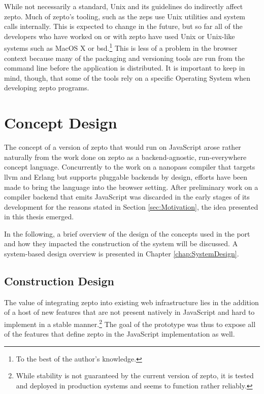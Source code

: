 \documentclass[oneside,11pt,xetex]{scrbook}
\begin{document}
While not necessarily a standard, Unix and its guidelines do indirectly affect zepto. Much of zepto's
tooling, such as the \gls{zeps} use Unix utilities and system calls internally. This is expected to change
in the future, but so far all of the developers who have worked on or with zepto have used Unix
or Unix-like systems such as MacOS X or \gls{bsd}.\footnote{To the best of the author's knowledge.}
This is less of a problem in the browser context because many of the packaging and versioning
tools are run from the command line before the application is distributed. It is important to
keep in mind, though, that some of the tools rely on a specific Operating System when
developing zepto programs.

\chapter{Concept Design}
\label{chap:ConceptDesign}

The concept of a version of zepto that would run on JavaScript arose rather
naturally from the work done on zepto as a backend-agnostic, run-everywhere
concept language. Concurrently to the work on a nanopass compiler that
targets \gls{llvm} and Erlang but supports pluggable backends by design, efforts
have been made to bring the language into the browser setting. After preliminary
work on a compiler backend that emits JavaScript was discarded in the
early stages of its development for the reasons stated in Section \ref{sec:Motivation},
the idea presented in this thesis emerged.

In the following, a brief overview of the design of the concepts used
in the port and how they impacted the construction of the system will be
discussed. A system-based design overview is presented in Chapter \ref{chap:SystemDesign}.

\section{Construction Design}
\label{sec:ConstructionDesign}

The value of integrating zepto into existing web infrastructure lies in
the addition of a host of new features that are not present natively in
JavaScript and hard to implement in a stable manner.\footnote{While stability
is not guaranteed by the current version of zepto, it is tested and deployed
in production systems and seems to function rather reliably.}  The goal of
the prototype was thus to expose all of the features that define zepto in
the JavaScript implementation as well.
\end{document}
